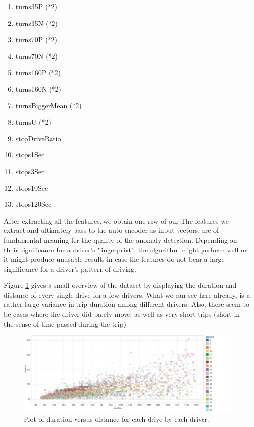 \documentclass{vldb}
\begin{document}
\begin{enumerate}
\item \label{itm:twenty-one} turns35P (*2)
\item \label{itm:twenty-two} turns35N (*2)
\item \label{itm:twenty-three} turns70P (*2)
\item \label{itm:twenty-four} turns70N (*2)
\item \label{itm:twenty-five} turns160P (*2)
\item \label{itm:twenty-six} turns160N (*2)
\item \label{itm:twenty-seven} turnsBiggerMean (*2)
\item \label{itm:twenty-eight} turnsU (*2)
\item \label{itm:twenty-nine} stopDriveRatio
\item \label{itm:thirty} stops1Sec
\item \label{itm:three}stops3Sec
\item \label{itm:two} stops10Sec
\item \label{itm:three} stops120Sec
\end{enumerate}

After extracting all the features, we obtain one row of our 
The features we extract and ultimately pass to the auto-encoder as input vectors, are of fundamental meaning for the quality of the anomaly detection. Depending on their significance for a driver's "fingerprint", the algorithm might perform well or it might produce unusable results in case the features do not bear a large significance for a driver's pattern of driving. 

Figure \ref{fig:duration-vs-distance} gives a small overview of the dataset by displaying the duration and distance of every single drive for a few drivers. What we can see here already, is a rather large variance in trip duration among different drivers. Also, there seem to be cases where the driver did barely move, as well as very short trips (short in the sense of time passed during the trip).\\
\begin{figure}
\centering
\includegraphics[width=\linewidth]{"pics/duration-vs-distance-driver"}
\caption{Plot of duration versus distance for each drive by each driver. }
\label{fig:duration-vs-distance}
\end{figure}
\end{document}
